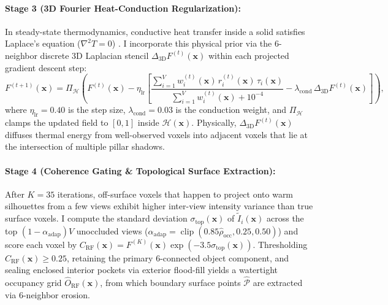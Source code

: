 \documentclass[12pt,letterpaper]{article}
\begin{document}
\paragraph{Stage 3 (3D Fourier Heat-Conduction Regularization):}
In steady-state thermodynamics, conductive heat transfer inside a solid satisfies Laplace's equation ($\nabla^2 T = 0$) \cite{chen2024thermal3dgs}. I incorporate this physical prior via the 6-neighbor discrete 3D Laplacian stencil $\Delta_{\text{3D}} F^{(t)}(\mathbf{x})$ within each projected gradient descent step:
\begin{equation}
  F^{(t+1)}(\mathbf{x}) = \Pi_{\mathcal{H}}\!\left(F^{(t)}(\mathbf{x}) - \eta_{\text{lr}} \left[ \frac{\sum_{i=1}^V w_i^{(t)}(\mathbf{x})\, r_i^{(t)}(\mathbf{x})\, \tau_i(\mathbf{x})}{\sum_{i=1}^V w_i^{(t)}(\mathbf{x}) + 10^{-4}} - \lambda_{\text{cond}}\, \Delta_{\text{3D}} F^{(t)}(\mathbf{x}) \right]\right),
  \label{eq:field_update}
\end{equation}
where $\eta_{\text{lr}} = 0.40$ is the step size, $\lambda_{\text{cond}} = 0.03$ is the conduction weight, and $\Pi_{\mathcal{H}}$ clamps the updated field to $[0, 1]$ inside $\mathcal{H}(\mathbf{x})$. Physically, $\Delta_{\text{3D}} F^{(t)}(\mathbf{x})$ diffuses thermal energy from well-observed voxels into adjacent voxels that lie at the intersection of multiple pillar shadows.

\paragraph{Stage 4 (Coherence Gating \& Topological Surface Extraction):}
After $K = 35$ iterations, off-surface voxels that happen to project onto warm silhouettes from a few views exhibit higher inter-view intensity variance than true surface voxels. I compute the standard deviation $\sigma_{\text{top}}(\mathbf{x})$ of $\tilde{I}_i(\mathbf{x})$ across the top $(1 - \alpha_{\text{adap}})V$ unoccluded views ($\alpha_{\text{adap}} = \operatorname{clip}(0.85\hat{\rho}_{\text{occ}}, 0.25, 0.50)$) and score each voxel by $C_{\text{RF}}(\mathbf{x}) = F^{(K)}(\mathbf{x}) \exp(-3.5\sigma_{\text{top}}(\mathbf{x}))$. Thresholding $C_{\text{RF}}(\mathbf{x}) \ge 0.25$, retaining the primary 6-connected object component, and sealing enclosed interior pockets via exterior flood-fill yields a watertight occupancy grid $\hat{O}_{\text{RF}}(\mathbf{x})$, from which boundary surface points $\hat{\mathcal{P}}$ are extracted via 6-neighbor erosion.
\end{document}
